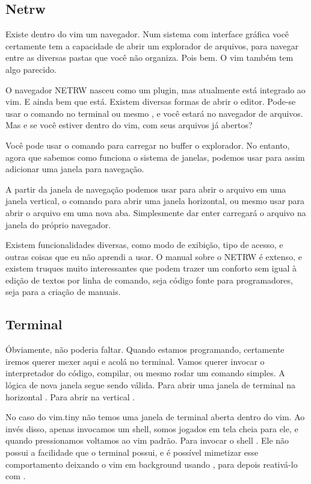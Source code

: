 \subsection{Netrw}
Existe dentro do vim um navegador.
Num sistema com interface gráfica você certamente tem a capacidade de abrir um
explorador de arquivos, para navegar entre as diversas pastas que você não organiza.
Pois bem. O vim também tem algo parecido.

O navegador NETRW nasceu como um plugin, mas atualmente está integrado ao vim.
E ainda bem que está.
Existem diversas formas de abrir o editor.
Pode-se usar o comando no terminal  ou 
mesmo , e você estará no navegador de arquivos.
Mas e se você estiver dentro do vim, com seus arquivos já abertos?

Você pode usar o comando  para carregar no buffer o explorador.
No entanto, agora que sabemos como funciona o sistema de janelas, podemos usar
 para assim adicionar uma janela para navegação.

A partir da janela de navegação podemos usar  para abrir o arquivo
em uma janela vertical, o comando  para abrir uma janela horizontal,
ou mesmo usar  para abrir o arquivo em uma nova aba.
Simplesmente dar enter carregará o arquivo na janela do próprio navegador.

Existem funcionalidades diversas, como modo de exibição, tipo de acesso,
e outras coisas que eu não aprendi a usar.
O manual sobre o NETRW é extenso, e existem truques muito interessantes
que podem trazer um conforto sem igual à edição de textos por linha de comando,
seja código fonte para programadores, seja para a criação de manuais.

\subsection{Terminal}
Óbviamente, não poderia faltar.
Quando estamos programando, certamente iremos querer mexer aqui e acolá no terminal.
Vamos querer invocar o interpretador do código, compilar, ou mesmo rodar um comando simples.
A lógica de nova janela segue sendo válida.
Para abrir uma janela de terminal na horizontal .
Para abrir na vertical .

No caso do vim.tiny não temos uma janela de terminal aberta dentro do vim.
Ao invés disso, apenas invocamos um shell, somos jogados em tela cheia para ele,
e quando pressionamos  voltamos ao vim padrão.
Para invocar o shell .
Ele não possui a facilidade que o terminal possui, e é possível mimetizar esse comportamento
deixando o vim em background usando , para depois reativá-lo com
.

